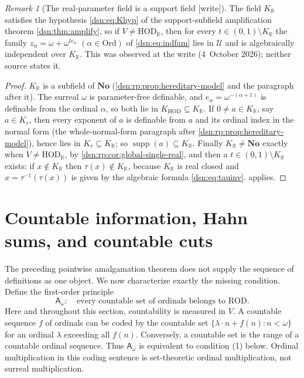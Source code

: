 \documentclass[11pt,a4paper]{article}
\numberwithin{equation}{section}
\theoremstyle{definition}
\theoremstyle{remark}
\newtheorem{remark}[remark]{Remark}
\newcommand{\No}{\mathbf{No}}
\newcommand{\Ord}{\mathrm{Ord}}
\newcommand{\HOD}{\mathrm{HOD}}
\newcommand{\R}{\mathbb R}
\newcommand{\supp}{\operatorname{supp}}
\newcommand{\Cell}{\mathcal U}
\newcommand{\KH}{K_{\HOD}}
\newcommand{\writetag}{\textup{\textsf{\small[write]}}}
\newcommand{\ROD}{\mathrm{ROD}}
\newcommand{\HR}{\HOD_{\R}}
\newcommand{\KR}{K_{\R}}
\newcommand{\Asm}{\mathsf A_{\omega}}
\begin{document}
\begin{remark}[The real-parameter field is a support field \writetag]
\label{dsn:rp:rem:support}
The field $\KR$ satisfies the hypothesis \eqref{dsn:eq:Khyp} of the
support-subfield amplification theorem \cref{dsn:thm:amplify}, so if
$V\ne\HR$, then for every $t\in(0,1)\setminus\KR$ the family
$z_\alpha=\omega+\omega^{te_\alpha}$ $(\alpha\in\Ord)$ of
\eqref{dsn:eq:indfam} lies in $\Cell$ and is algebraically independent over
$\KR$. This was observed at the write (4~October 2026); neither source
states it.
\end{remark}
\begin{proof}
$\KR$ is a subfield of $\No$ (\cref{dsn:rp:prop:hereditary-model} and the
paragraph after it). The surreal $\omega$ is parameter-free definable, and
$e_\alpha=\omega^{-(\alpha+1)}$ is definable from the ordinal $\alpha$, so
both lie in $\KH\subseteq\KR$. If $0\ne a\in\KR$, say $a\in K_r$, then every
exponent of $a$ is definable from $a$ and its ordinal index in the normal
form (the whole-normal-form paragraph after
\cref{dsn:rp:prop:hereditary-model}), hence lies in $K_r\subseteq\KR$; so
$\supp(a)\subseteq\KR$. Finally $\KR\ne\No$ exactly when $V\ne\HR$, by
\cref{dsn:rp:cor:global-single-real}, and then a $t\in(0,1)\setminus\KR$
exists: if $x\notin\KR$ then $\tau(x)\notin\KR$, because $\KR$ is real closed
and $x=\tau^{-1}(\tau(x))$ is given by the algebraic formula
\eqref{dsn:eq:tauinv}.  applies.
\end{proof}

\section{Countable information, Hahn sums, and countable cuts}
\label{dsn:rp:sec:countable}

The preceding pointwise amalgamation theorem does not supply the sequence
of definitions as one object. We now characterize exactly the missing
condition. Define the first-order principle
\begin{equation}\label{dsn:rp:eq:countable-principle}
 \Asm:\quad\text{every countable set of ordinals belongs to }\ROD.
\end{equation}
Here and throughout this section, countability is measured in $V$.
A countable sequence $f$ of ordinals can be coded by the countable set
$\{\lambda\cdot n+f(n):n<\omega\}$ for an ordinal $\lambda$ exceeding all
$f(n)$. Conversely, a countable set is the range of a countable ordinal
sequence. Thus $\Asm$ is equivalent to condition (1) below. Ordinal
multiplication in this coding sentence is set-theoretic ordinal
multiplication, not surreal multiplication.
\end{document}
